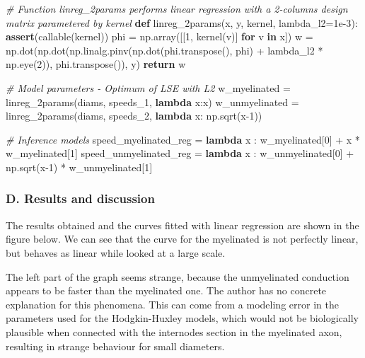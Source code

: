\documentclass[]{article}
\newenvironment{Shaded}{}{}
\newcommand{\BuiltInTok}[1]{#1}
\newcommand{\CommentTok}[1]{\textcolor[rgb]{0.38,0.63,0.69}{\textit{#1}}}
\newcommand{\ControlFlowTok}[1]{\textcolor[rgb]{0.00,0.44,0.13}{\textbf{#1}}}
\newcommand{\DecValTok}[1]{\textcolor[rgb]{0.25,0.63,0.44}{#1}}
\newcommand{\FloatTok}[1]{\textcolor[rgb]{0.25,0.63,0.44}{#1}}
\newcommand{\KeywordTok}[1]{\textcolor[rgb]{0.00,0.44,0.13}{\textbf{#1}}}
\newcommand{\NormalTok}[1]{#1}
\newcommand{\OperatorTok}[1]{\textcolor[rgb]{0.40,0.40,0.40}{#1}}
\begin{document}
\begin{Shaded}
\begin{Highlighting}[]
\CommentTok{# Function linreg_2params performs linear regression with a 2-columns design matrix parametered by kernel}
\KeywordTok{def}\NormalTok{ linreg_2params(x, y, kernel, lambda_l2}\OperatorTok{=}\FloatTok{1e-3}\NormalTok{): }
    \ControlFlowTok{assert}\NormalTok{(}\BuiltInTok{callable}\NormalTok{(kernel))}
\NormalTok{    phi }\OperatorTok{=}\NormalTok{ np.array([[}\DecValTok{1}\NormalTok{, kernel(v)] }\ControlFlowTok{for}\NormalTok{ v }\KeywordTok{in}\NormalTok{ x])}
\NormalTok{    w }\OperatorTok{=}\NormalTok{ np.dot(np.dot(np.linalg.pinv(np.dot(phi.transpose(), phi) }\OperatorTok{+}\NormalTok{ lambda_l2 }\OperatorTok{*}\NormalTok{ np.eye(}\DecValTok{2}\NormalTok{)), phi.transpose()), y)}
    \ControlFlowTok{return}\NormalTok{ w}

\CommentTok{# Model parameters - Optimum of LSE with L2 }
\NormalTok{w_myelinated }\OperatorTok{=}\NormalTok{ linreg_2params(diams, speeds_1, }\KeywordTok{lambda}\NormalTok{ x:x)}
\NormalTok{w_unmyelinated }\OperatorTok{=}\NormalTok{ linreg_2params(diams, speeds_2, }\KeywordTok{lambda}\NormalTok{ x: np.sqrt(x}\DecValTok{-1}\NormalTok{))}

\CommentTok{# Inference models}
\NormalTok{speed_myelinated_reg }\OperatorTok{=} \KeywordTok{lambda}\NormalTok{ x : w_myelinated[}\DecValTok{0}\NormalTok{] }\OperatorTok{+}\NormalTok{ x }\OperatorTok{*}\NormalTok{ w_myelinated[}\DecValTok{1}\NormalTok{]}
\NormalTok{speed_unmyelinated_reg }\OperatorTok{=} \KeywordTok{lambda}\NormalTok{ x : w_unmyelinated[}\DecValTok{0}\NormalTok{] }\OperatorTok{+}\NormalTok{ np.sqrt(x}\DecValTok{-1}\NormalTok{) }\OperatorTok{*}\NormalTok{ w_unmyelinated[}\DecValTok{1}\NormalTok{]}
\end{Highlighting}
\end{Shaded}

\hypertarget{d.-results-and-discussion}{%
\subsubsection{D. Results and
discussion}\label{d.-results-and-discussion}}

The results obtained and the curves fitted with linear regression are
shown in the figure below. We can see that the curve for the myelinated
is not perfectly linear, but behaves as linear while looked at a large
scale.

The left part of the graph seems strange, because the unmyelinated
conduction appears to be faster than the myelinated one. The author has
no concrete explanation for this phenomena. This can come from a
modeling error in the parameters used for the Hodgkin-Huxley models,
which would not be biologically plausible when connected with the
internodes section in the myelinated axon, resulting in strange
behaviour for small diameters.
\end{document}
